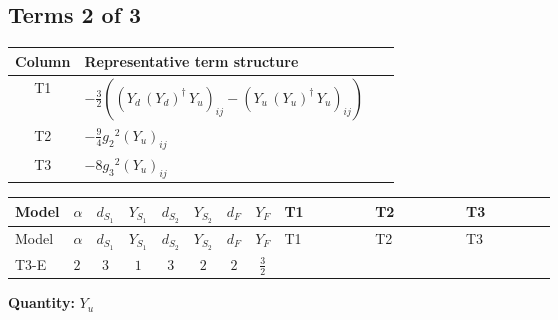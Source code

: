 \documentclass[8pt]{article}
\begin{document}
\begin{landscape}
\subsection*{Terms 2 of 3}
\begin{center}
\begin{tabular}{@{}c >{\raggedright\arraybackslash}p{0.82\linewidth}@{}}
\toprule
Column & Representative term structure \\
\midrule
T1 & \(\displaystyle -\frac{3}{2} (\left({Y_d}\,\left({Y_d}\right)^{\dagger}\,{Y_u}\right)_{ij}-\left({Y_u}\,\left({Y_u}\right)^{\dagger}\,{Y_u}\right)_{ij})\) \\
\midrule
T2 & \(\displaystyle -\frac{9}{4} {g_2}^2 \left({Y_u}\right)_{ij}\) \\
\midrule
T3 & \(\displaystyle -8 {g_3}^2 \left({Y_u}\right)_{ij}\) \\
\midrule
\bottomrule
\end{tabular}
\end{center}
\smallskip
\tiny
\begin{longtable}{@{}llcccccc >{\raggedright\arraybackslash}p{0.21\linewidth} >{\raggedright\arraybackslash}p{0.21\linewidth} >{\raggedright\arraybackslash}p{0.21\linewidth}@{}}
\toprule
Model & $\alpha$ & $d_{S_1}$ & $Y_{S_1}$ & $d_{S_2}$ & $Y_{S_2}$ & $d_F$ & $Y_F$ & T1 & T2 & T3 \\
\midrule
\endfirsthead
\toprule
Model & $\alpha$ & $d_{S_1}$ & $Y_{S_1}$ & $d_{S_2}$ & $Y_{S_2}$ & $d_F$ & $Y_F$ & T1 & T2 & T3 \\
\midrule
\endhead
T3-E & $2$ & $3$ & $1$ & $3$ & $2$ & $2$ & $\frac{3}{2}$ & \scriptsize\adjustbox{max width=\linewidth}{$\begin{gathered} -\frac{3}{2} (\left({Y_d}\,\left({Y_d}\right)^{\dagger}\,{Y_u}\right)_{ij}-\left({Y_u}\,\left({Y_u}\right)^{\dagger}\,{Y_u}\right)_{ij})\end{gathered}$} & \scriptsize\adjustbox{max width=\linewidth}{$\begin{gathered} -\frac{9}{4} {g_2}^2 \left({Y_u}\right)_{ij}\end{gathered}$} & \scriptsize\adjustbox{max width=\linewidth}{$\begin{gathered} -8 {g_3}^2 \left({Y_u}\right)_{ij}\end{gathered}$} \\
\midrule
\bottomrule
\end{longtable}
\clearpage
\noindent\textbf{Quantity: }$Y_u$\par\smallskip

\end{landscape}
\end{document}
